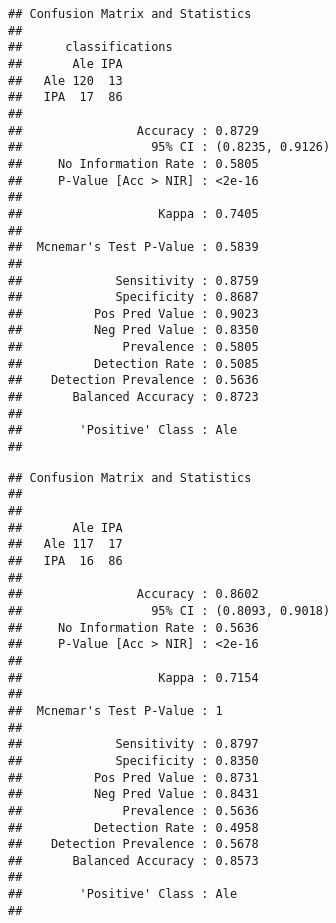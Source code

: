\documentclass[
]{article}
\newenvironment{Shaded}{\begin{snugshade}}{\end{snugshade}}
\newcommand{\CommentTok}[1]{\textcolor[rgb]{0.56,0.35,0.01}{\textit{#1}}}
\newcommand{\DecValTok}[1]{\textcolor[rgb]{0.00,0.00,0.81}{#1}}
\newcommand{\KeywordTok}[1]{\textcolor[rgb]{0.13,0.29,0.53}{\textbf{#1}}}
\newcommand{\NormalTok}[1]{#1}
\newcommand{\OperatorTok}[1]{\textcolor[rgb]{0.81,0.36,0.00}{\textbf{#1}}}
\newcommand{\StringTok}[1]{\textcolor[rgb]{0.31,0.60,0.02}{#1}}
\begin{document}
\begin{verbatim}
## Confusion Matrix and Statistics
## 
##      classifications
##       Ale IPA
##   Ale 120  13
##   IPA  17  86
##                                           
##                Accuracy : 0.8729          
##                  95% CI : (0.8235, 0.9126)
##     No Information Rate : 0.5805          
##     P-Value [Acc > NIR] : <2e-16          
##                                           
##                   Kappa : 0.7405          
##                                           
##  Mcnemar's Test P-Value : 0.5839          
##                                           
##             Sensitivity : 0.8759          
##             Specificity : 0.8687          
##          Pos Pred Value : 0.9023          
##          Neg Pred Value : 0.8350          
##              Prevalence : 0.5805          
##          Detection Rate : 0.5085          
##    Detection Prevalence : 0.5636          
##       Balanced Accuracy : 0.8723          
##                                           
##        'Positive' Class : Ale             
## 
\end{verbatim}

\begin{Shaded}
\end{Shaded}

\begin{verbatim}
## Confusion Matrix and Statistics
## 
##      
##       Ale IPA
##   Ale 117  17
##   IPA  16  86
##                                           
##                Accuracy : 0.8602          
##                  95% CI : (0.8093, 0.9018)
##     No Information Rate : 0.5636          
##     P-Value [Acc > NIR] : <2e-16          
##                                           
##                   Kappa : 0.7154          
##                                           
##  Mcnemar's Test P-Value : 1               
##                                           
##             Sensitivity : 0.8797          
##             Specificity : 0.8350          
##          Pos Pred Value : 0.8731          
##          Neg Pred Value : 0.8431          
##              Prevalence : 0.5636          
##          Detection Rate : 0.4958          
##    Detection Prevalence : 0.5678          
##       Balanced Accuracy : 0.8573          
##                                           
##        'Positive' Class : Ale             
## 
\end{verbatim}
\end{document}
